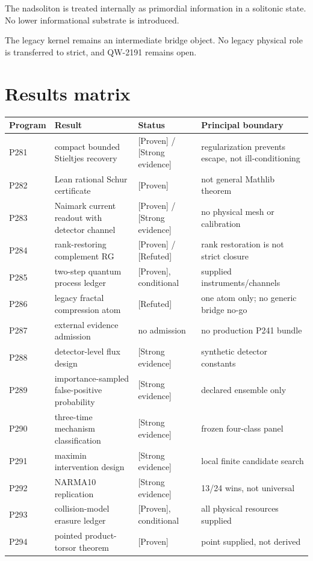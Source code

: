 \documentclass[11pt,a4paper,openany]{report}
\newcommand{\statusProven}{\textcolor{fingreen}{[Proven]}}
\newcommand{\statusStrong}{\textcolor{finblue}{[Strong evidence]}}
\newcommand{\statusRefuted}{\textcolor{finred}{[Refuted]}}
\begin{document}
The nadsoliton is treated internally as primordial information in a solitonic state. No lower informational substrate is introduced.

The legacy kernel remains an intermediate bridge object. No legacy physical role is transferred to strict, and QW-2191 remains open.

\chapter{Results matrix}

\begin{center}
\begingroup\small
\setlength{\tabcolsep}{2.5pt}
\renewcommand{\arraystretch}{1.16}
\begin{longtable}{@{}p{}p{}p{}p{}@{}}
\toprule
\textbf{Program} & \textbf{Result} & \textbf{Status} & \textbf{Principal boundary} \\
\midrule
\endhead
P281 & compact bounded Stieltjes recovery & \statusProven{} /\allowbreak{} \statusStrong{} & regularization prevents escape, not ill-conditioning \\
P282 & Lean rational Schur certificate & \statusProven{} & not general Mathlib theorem \\
P283 & Naimark current readout with detector channel & \statusProven{} /\allowbreak{} \statusStrong{} & no physical mesh or calibration \\
P284 & rank-restoring complement RG & \statusProven{} /\allowbreak{} \statusRefuted{} & rank restoration is not strict closure \\
P285 & two-step quantum process ledger & \statusProven{}, conditional & supplied instruments/\allowbreak{}channels \\
P286 & legacy fractal compression atom & \statusRefuted{} & one atom only; no generic bridge no-go \\
P287 & external evidence admission & no admission & no production P241 bundle \\
P288 & detector-level flux design & \statusStrong{} & synthetic detector constants \\
P289 & importance-sampled false-positive probability & \statusStrong{} & declared ensemble only \\
P290 & three-time mechanism classification & \statusStrong{} & frozen four-class panel \\
P291 & maximin intervention design & \statusStrong{} & local finite candidate search \\
P292 & NARMA10 replication & \statusStrong{} & 13/\allowbreak{}24 wins, not universal \\
P293 & collision-model erasure ledger & \statusProven{}, conditional & all physical resources supplied \\
P294 & pointed product-torsor theorem & \statusProven{} & point supplied, not derived \\
\bottomrule
\end{longtable}
\endgroup
\end{center}
\end{document}
